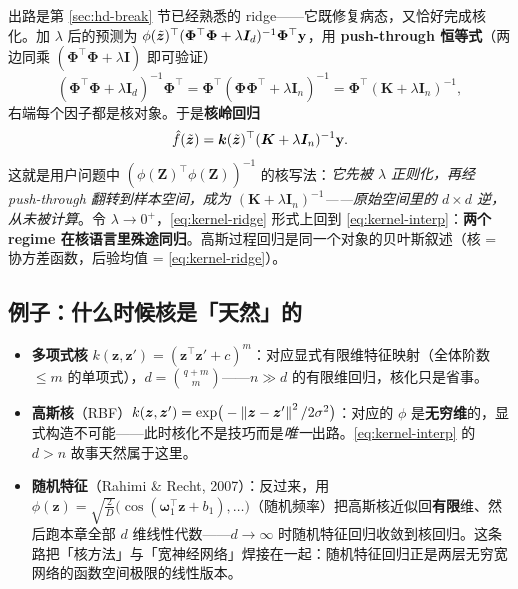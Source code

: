 出路是第 \ref{sec:hd-break} 节已经熟悉的 ridge——它既修复病态，又恰好完成核化。加 $\lambda$ 后的预测为 $\phi(\tilde{\bm{z}})^\top(\bm{\Phi}^\top\bm{\Phi} + \lambda \bm{I}_d)^{-1}\bm{\Phi}^\top\mathbf{y}$，用 \textbf{push-through 恒等式}（两边同乘 $(\bm{\Phi}^\top\bm{\Phi} + \lambda\bm{I})$ 即可验证）
\begin{equation}\label{eq:push-through}
  (\bm{\Phi}^\top\bm{\Phi} + \lambda \bm{I}_d)^{-1} \bm{\Phi}^\top
  = \bm{\Phi}^\top (\bm{\Phi}\bm{\Phi}^\top + \lambda \bm{I}_n)^{-1}
  = \bm{\Phi}^\top (\bm{K} + \lambda \bm{I}_n)^{-1},
\end{equation}
右端每个因子都是核对象。于是\textbf{核岭回归}
\begin{equation}\label{eq:kernel-ridge}
  \hat{f}(\tilde{\bm{z}}) = \bm{k}(\tilde{\bm{z}})^\top (\bm{K} + \lambda \bm{I}_n)^{-1} \mathbf{y} .
\end{equation}
这就是用户问题中 $(\phi(\bm{Z})^\top\phi(\bm{Z}))^{-1}$ 的核写法：\textit{它先被 $\lambda$ 正则化，再经 push-through 翻转到样本空间，成为 $(\bm{K} + \lambda\bm{I}_n)^{-1}$——原始空间里的 $d \times d$ 逆，从未被计算}。令 $\lambda \to 0^+$，\eqref{eq:kernel-ridge} 形式上回到 \eqref{eq:kernel-interp}：\textbf{两个 regime 在核语言里殊途同归}。高斯过程回归是同一个对象的贝叶斯叙述（核 = 协方差函数，后验均值 = \eqref{eq:kernel-ridge}）\cite{scholkopf2002}。

\subsection{例子：什么时候核是「天然」的}\label{sec:kernel-examples}

\begin{itemize}
  \item \textbf{多项式核} $k(\bm{z}, \bm{z}') = (\bm{z}^\top \bm{z}' + c)^m$：对应显式有限维特征映射（全体阶数 $\le m$ 的单项式），$d = \binom{q+m}{m}$——$n \gg d$ 的有限维回归，核化只是省事。
  \item \textbf{高斯核}（RBF）$k(\bm{z}, \bm{z}') = \exp\!\big( -\left\lVert \bm{z} - \bm{z}' \right\rVert^2 / 2\sigma^2 \big)$：对应的 $\phi$ 是\textbf{无穷维}的，显式构造不可能——此时核化不是技巧而是\textit{唯一}出路。\eqref{eq:kernel-interp} 的 $d > n$ 故事天然属于这里。
  \item \textbf{随机特征}（Rahimi \& Recht, 2007）：反过来，用 $\phi(\bm{z}) = \sqrt{\tfrac{2}{D}}\big(\cos(\bm{\omega}_1^\top \bm{z} + b_1), \dots\big)$（随机频率）把高斯核近似回\textbf{有限}维、然后跑本章全部 $d$ 维线性代数——$d \to \infty$ 时随机特征回归收敛到核回归\cite{rahimi2007}。这条路把「核方法」与「宽神经网络」焊接在一起：随机特征回归正是两层无穷宽网络的函数空间极限的线性版本。
\end{itemize}

